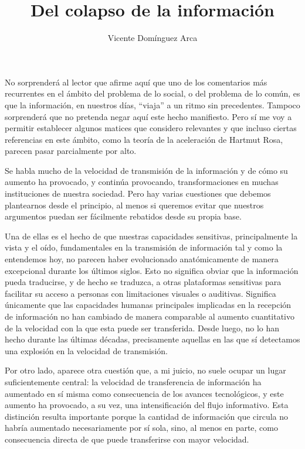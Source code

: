 \documentclass[11pt,a4paper]{article}
\title{\textbf{Del colapso de la información}}
\author{Vicente Domínguez Arca}
\date{}
\begin{document}
\maketitle

No sorprenderá al lector que afirme aquí que uno de los comentarios más recurrentes en el ámbito del problema de lo social, o del problema de lo común, es que la información, en nuestros días, \enquote{viaja} a un ritmo sin precedentes. Tampoco sorprenderá que no pretenda negar aquí este hecho manifiesto. Pero sí me voy a permitir establecer algunos matices que considero relevantes y que incluso ciertas referencias en este ámbito, como la teoría de la aceleración de Hartmut Rosa, parecen pasar parcialmente por alto.

Se habla mucho de la velocidad de transmisión de la información y de cómo su aumento ha provocado, y continúa provocando, transformaciones en muchas instituciones de nuestra sociedad. Pero hay varias cuestiones que debemos plantearnos desde el principio, al menos si queremos evitar que nuestros argumentos puedan ser fácilmente rebatidos desde su propia base.

Una de ellas es el hecho de que nuestras capacidades sensitivas, principalmente la vista y el oído, fundamentales en la transmisión de información tal y como la entendemos hoy, no parecen haber evolucionado anatómicamente de manera excepcional durante los últimos siglos. Esto no significa obviar que la información pueda traducirse, y de hecho se traduzca, a otras plataformas sensitivas para facilitar su acceso a personas con limitaciones visuales o auditivas. Significa únicamente que las capacidades humanas principales implicadas en la recepción de información no han cambiado de manera comparable al aumento cuantitativo de la velocidad con la que esta puede ser transferida. Desde luego, no lo han hecho durante las últimas décadas, precisamente aquellas en las que sí detectamos una explosión en la velocidad de transmisión.

Por otro lado, aparece otra cuestión que, a mi juicio, no suele ocupar un lugar suficientemente central: la velocidad de transferencia de información ha aumentado en sí misma como consecuencia de los avances tecnológicos, y este aumento ha provocado, a su vez, una intensificación del flujo informativo. Esta distinción resulta importante porque la cantidad de información que circula no habría aumentado necesariamente por sí sola, sino, al menos en parte, como consecuencia directa de que puede transferirse con mayor velocidad.
\end{document}

